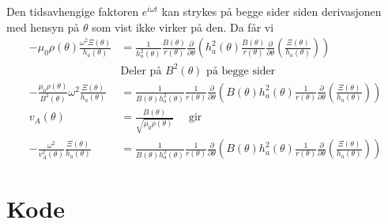 \documentclass[reprint, english,notitlepage]{revtex4-1}  %
\begin{document}
Den tidsavhengige faktoren $e^{i \omega t}$ kan strykes på begge sider siden derivasjonen med hensyn på $\theta$ som vist ikke virker på den. Da får vi
\begin{align*}
  - \mu_0 \rho(\theta) \frac{ \omega^2 \Xi(\theta) }{h_a(\theta)} &= \frac{1}{h_a^2(\theta)} \frac{B(\theta)}{r(\theta)} \frac{\partial}{\partial \theta} \left( h_a^2(\theta) \frac{B(\theta)}{r(\theta)} \frac{\partial}{\partial \theta} \left( \frac{ \Xi(\theta) }{h_a(\theta)} \right) \right) \\
  &\text{Deler på $B^2(\theta)$ på begge sider} \\
  - \frac{\mu_0 \rho(\theta)}{B^2(\theta)} \omega^2 \frac{\Xi(\theta)}{h_a(\theta)} &= \frac{1}{B(\theta) h_a^2(\theta)} \frac{1}{r(\theta)} \frac{\partial}{\partial \theta} \left( B(\theta) h_a^2(\theta) \frac{1}{r(\theta)} \frac{\partial}{\partial \theta} \left( \frac{ \Xi(\theta) }{h_a(\theta)} \right) \right) \\
  v_A(\theta) &= \frac{B(\theta)}{\sqrt{\mu_0 \rho(\theta)}} \quad \text{ gir} \\
  - \frac{\omega^2}{v_A^2(\theta)} \frac{\Xi(\theta)}{h_a(\theta)} &= \frac{1}{B(\theta) h_a^2(\theta)} \frac{1}{r(\theta)} \frac{\partial}{\partial \theta} \left( B(\theta) h_a^2(\theta) \frac{1}{r(\theta)} \frac{\partial}{\partial \theta} \left( \frac{ \Xi(\theta) }{h_a(\theta)} \right) \right)
\end{align*}





\section{Kode}
\end{document}
